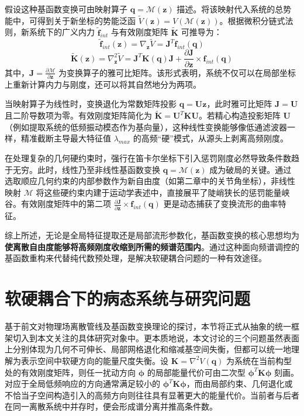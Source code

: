 假设这种基函数变换可由映射算子 $\mathbf{q} = \mathcal{M}(\mathbf{z})$ 描述。将该映射代入系统的总势能中，可得到关于新坐标的势能泛函 $\tilde{V}(\mathbf{z}) = V(\mathcal{M}(\mathbf{z}))$。根据微积分链式法则，新系统下的广义内力 $\tilde{\mathbf{f}}_{int}$ 与有效刚度矩阵 $\tilde{\mathbf{K}}$ 可推导为：
\begin{equation}
    \tilde{\mathbf{f}}_{int}(\mathbf{z}) = \nabla_{\mathbf{z}} \tilde{V} = \mathbf{J}^T \mathbf{f}_{int}(\mathbf{q})
\end{equation}
\begin{equation}
    \tilde{\mathbf{K}}(\mathbf{z}) = \nabla_{\mathbf{z}}^2 \tilde{V} = \mathbf{J}^T \mathbf{K}(\mathbf{q}) \mathbf{J} + \frac{\partial \mathbf{J}}{\partial \mathbf{z}} \times \mathbf{f}_{int}(\mathbf{q})
\end{equation}
其中，$\mathbf{J} = \frac{\partial \mathcal{M}}{\partial \mathbf{z}}$ 为变换算子的雅可比矩阵。该形式表明，系统不仅可以在局部坐标上重新计算内力与刚度，还可以将其自然地分为两项。

当映射算子为线性时，变换退化为常数矩阵投影 $\mathbf{q} = \mathbf{U} \mathbf{z}$，此时雅可比矩阵 $\mathbf{J} = \mathbf{U}$ 且二阶导数项为零。有效刚度矩阵简化为 $\tilde{\mathbf{K}} = \mathbf{U}^T \mathbf{K} \mathbf{U}$。若精心构造投影矩阵 $\mathbf{U}$（例如提取系统的低频振动模态作为基向量），这种线性变换能够像低通滤波器一样，精准截断主导最大特征值 $\lambda_{max}$ 的高频“硬”模式，从源头上剥离高频刚度。

在处理复杂的几何硬约束时，强行在笛卡尔坐标下引入惩罚刚度必然导致条件数趋于无穷。此时，线性乃至非线性基函数变换 $\mathbf{q} = \mathcal{M}(\mathbf{z})$ 成为破局的关键。通过选取顺应几何约束的内部参数作为新自由度（如第二章中的关节角坐标），非线性映射 $\mathcal{M}$ 将这些硬约束内建于运动学表述中，直接展平了陡峭狭长的惩罚能量峡谷。有效刚度矩阵中的第二项 $\frac{\partial \mathbf{J}}{\partial \mathbf{z}} \times \mathbf{f}_{int}(\mathbf{q})$ 更是动态捕获了变换流形的曲率特征。

综上所述，无论是全局特征提取还是局部流形参数化，基函数变换的核心思想均为\textbf{使离散自由度能够将高频刚度收缩到所需的频谱范围内}。通过这种面向频谱调控的基函数重构来代替纯代数预处理，是解决软硬耦合问题的一种有效途径。
\section{软硬耦合下的病态系统与研究问题}
基于前文对物理场离散管线及基函数变换理论的探讨，本节将正式从抽象的统一框架切入到本文关注的具体研究对象中。更本质地说，本文讨论的三个问题虽然表面上分别体现为几何不可伸长、局部网格退化和缩减基空间失衡，但都可以统一地理解为表示空间中软硬方向的能量尺度失衡。设 $\mathbf{K}=\nabla^2 V(\mathbf{q})$ 为系统在当前构型处的有效刚度矩阵，则任一扰动方向 $\boldsymbol{\phi}$ 的局部能量代价可由二次型 $\boldsymbol{\phi}^T \mathbf{K} \boldsymbol{\phi}$ 刻画。对应于全局低频响应的方向通常满足较小的 $\boldsymbol{\phi}^T \mathbf{K} \boldsymbol{\phi}$，而由局部约束、几何退化或不恰当子空间构造引入的高频方向则往往具有显著更大的能量代价。当前者与后者在同一离散系统中并存时，便会形成谱分离并推高条件数。

